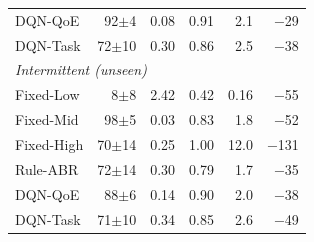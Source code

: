 \begin{tabular}{lrrrrr}
\hspace{1mm}DQN-QoE & 92$\pm$4 & 0.08 & 0.91 & 2.1 & $-$29 \\
\hspace{1mm}DQN-Task & 72$\pm$10 & 0.30 & 0.86 & 2.5 & $-$38 \\
\hline
\multicolumn{6}{l}{\textit{Intermittent (unseen)}} \\
\hspace{1mm}Fixed-Low & 8$\pm$8 & 2.42 & 0.42 & 0.16 & $-$55 \\
\hspace{1mm}Fixed-Mid & 98$\pm$5 & 0.03 & 0.83 & 1.8 & $-$52 \\
\hspace{1mm}Fixed-High & 70$\pm$14 & 0.25 & 1.00 & 12.0 & $-$131 \\
\hspace{1mm}Rule-ABR & 72$\pm$14 & 0.30 & 0.79 & 1.7 & $-$35 \\
\hspace{1mm}DQN-QoE & 88$\pm$6 & 0.14 & 0.90 & 2.0 & $-$38 \\
\hspace{1mm}DQN-Task & 71$\pm$10 & 0.34 & 0.85 & 2.6 & $-$49 \\
\hline
\end{tabular}
